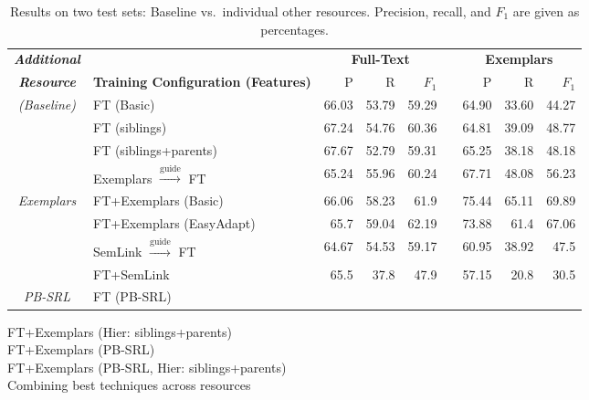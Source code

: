 \begin{table*}\centering\small
\begin{tabular}{>{\itshape}clrrr@{~~}r@{~~}rrr}
\toprule
\normalfont\textbf{Additional} & & \multicolumn{3}{c}{\textbf{Full-Text}} && \multicolumn{3}{c}{\textbf{Exemplars}} \\
\cline{3-5}\cline{7-9}
\normalfont\textbf{Resource} & \textbf{Training Configuration (Features)} & P\hphantom{11} & R\hphantom{11} & $F_1$\hphantom{0} && P\hphantom{11} & R\hphantom{11} & $F_1$\hphantom{0} \\
\midrule
(Baseline) & FT (Basic) & 66.03 & 53.79 & 59.29 && 64.90 & 33.60 & 44.27 \\
\midrule
\multirow{2}{*}{FN Hierarchy} & FT (siblings) & 67.24 & 54.76 & 60.36 && 64.81 & 39.09 & 48.77 \\
          & FT (siblings+parents) & 67.67 & 52.79 & 59.31 && 65.25 & 38.18 & 48.18 \\
\midrule
& Exemplars $\xrightarrow{\text{guide}}$ FT & 65.24 & 55.96 & 60.24 && 67.71 & 48.08 & 56.23\\
Exemplars & FT+Exemplars (Basic) & 66.06 & 58.23 & 61.9 && 75.44 & 65.11 & 69.89 \\
& FT+Exemplars (EasyAdapt) & 65.7 & 59.04 & 62.19 && 73.88 & 61.4 & 67.06 \\
\midrule
\multirow{2}{*}{SemLink} & SemLink $\xrightarrow{\text{guide}}$ FT & 64.67 & 54.53 & 59.17 && 60.95 & 38.92 & 47.5 \\
& FT+SemLink & 65.5 & 37.8 & 47.9 && 57.15 & 20.8 & 30.5 \\
\midrule
PB-SRL & FT (PB-SRL) \\
\bottomrule
\end{tabular}
\caption{Results on two test sets: Baseline vs.~individual other resources. 
Precision, recall, and $F_1$ are given as percentages.}
\label{tbl:results}
\end{table*}

\begin{table*}\centering\small
FT+Exemplars (Hier: siblings+parents) \\
FT+Exemplars (PB-SRL) \\
FT+Exemplars (PB-SRL, Hier: siblings+parents) \\
\caption{Combining best techniques across resources }
\end{table*}
